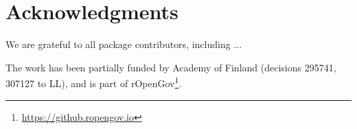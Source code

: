\documentclass[article]{jss}
\begin{document}


\section*{Acknowledgments}

We are grateful to all package contributors, including ... 

The work has been partially funded by Academy of Finland (decisions 295741, 307127 to LL), and is part of rOpenGov\footnote{\url{https://github.ropengov.io}}.


\end{document}
